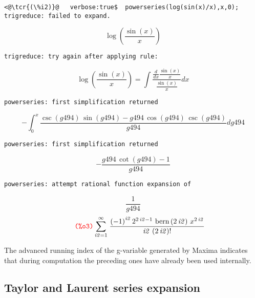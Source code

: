 \documentclass[../Maxima_Workbook.tex]{subfiles}
\begin{document}
\lz \begin{small}
\color{blue} \leqn
\begin{lstlisting}
<@\tcr{(\%i2)}@   verbose:true$  powerseries(log(sin(x)/x),x,0);
trigreduce: failed to expand.
\end{lstlisting}
\vspace{-2mm} \[ \log{\left( \frac{\sin{(x)}}{x}\right) }\]
\vspace{-4mm} \begin{lstlisting}
trigreduce: try again after applying rule:
\end{lstlisting}
\[ \log{\left( \frac{\sin{(x)}}{x}\right) }=\int {\left. \frac{\frac{d}{d x} \frac{\sin{(x)}}{x}}{\frac{\sin{(x)}}{x}}dx\right.} \]
\vspace{-4mm} \begin{lstlisting}
powerseries: first simplification returned 
\end{lstlisting}
\[ -\int_{0}^{x}{\left. \frac{\csc{\left( \mathit{g494}\right) }\, \sin{\left( \mathit{g494}\right) }-\mathit{g494}\, \cos{\left( \mathit{g494}\right) }\, \csc{\left( \mathit{g494}\right) }}{\mathit{g494}}d\mathit{g494}\right.} \]
\vspace{-4mm} \begin{lstlisting}
powerseries: first simplification returned  
\end{lstlisting}
\[ -\frac{\mathit{g494}\, \cot{\left( \mathit{g494}\right) }-1}{\mathit{g494}} \]
\vspace{-4mm} \begin{lstlisting}
powerseries: attempt rational function expansion of  
\end{lstlisting}
\[ \frac{1}{\mathit{g494}}\]
\vspace{-4mm} \[\tag*{\tcr{\ttfamily (\%o3)}} \sum_{\mathit{i2}=1}^{\infty }{\left. \frac{{{\left( -1\right) }^{\mathit{i2}}}\, {{2}^{2 \, \mathit{i2}-1}}\, \operatorname{bern}\left( 2 \, \mathit{i2}\right) \, {{x}^{2 \, \mathit{i2}}}}{\mathit{i2}\, \left( 2 \, \mathit{i2}\right) !}\right.} \]
\color{black} \reqn
\end{small} \vspace{-2mm}

\lz The advanced running index of the g-variable generated by Maxima indicates that during computation the preceding ones have already been used internally.

\subsection{Taylor and Laurent series expansion}
\end{document}
